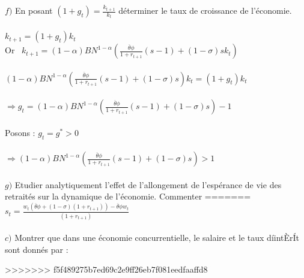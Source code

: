 \documentclass[11pt,twoside,a4paper]{article}
\begin{document}
$f)$ En posant  $(1+g_t)=\frac{k_{t+1}}{k_t}$ déterminer le taux de croissance de l'économie.\\ \\
$k_{t+1}=(1+g_t)k_t$\\
Or \ $k_{t+1}=(1-\alpha)B N^{1-\alpha}\left(\frac{\overline{\theta}\phi}{1+r_{t+1}}(s-1) +(1- \sigma)sk_t \right)$\\ \\
$(1-\alpha)B N^{1-\alpha}\left(\frac{\overline{\theta}\phi}{1+r_{t+1}}(s-1) +(1- \sigma)s \right)k_t=(1+g_t)k_t$\\ \\
$\Rightarrow g_t=(1-\alpha)B N^{1-\alpha}\left(\frac{\overline{\theta}\phi}{1+r_{t+1}}(s-1) +(1- \sigma)s \right)-1$\\ \\
Posons : $g_t=g^*>0$\\ \\
$\Rightarrow (1-\alpha)B N^{1-\alpha}\left(\frac{\overline{\theta}\phi}{1+r_{t+1}}(s-1) +(1- \sigma)s \right)>1$\\ \\


$g)$ Etudier analytiquement l'effet de l'allongement de l'espérance de vie des
retraités sur la dynamique de l'économie. Commenter
=======
  $s_t=\frac{ w_t\left(\overline{\theta}\phi +(1- \sigma)(1+r_{t+1}) \right)-\overline{\theta}\phi w_t}{(1+r_{t+1})}$\\ \\






$c)$ Montrer que dans une économie concurrentielle, le salaire et le taux díintÈrÍt sont donnés par :




>>>>>>> f5f489275b7ed69c2e9ff26eb7f081eedfaaffd8
\end{document}
